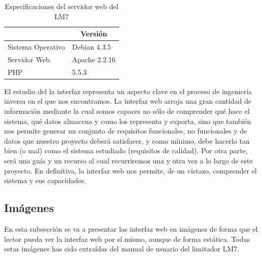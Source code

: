 \begin{table}[h]
    \centering
    \begin{tabular}{|l|l|}
        \hline
        \rowcolor[HTML]{ECF4FF}
        \multicolumn{1}{|c|}{\cellcolor[HTML]{ECF4FF}\textbf{Tecnología}} & \multicolumn{1}{c|}{\cellcolor[HTML]{ECF4FF}\textbf{Versión}} \\ \hline
        Sistema Operativo                                                 & Debian 4.3.5                                                  \\ \hline
        Servidor Web                                                      & Apache 2.2.16                                                 \\ \hline
        PHP                                                               & 5.5.3                                                         \\ \hline
    \end{tabular}
    \caption{Especificaciones del servidor web del \gls{LM7}}
    \label{tab:lm7_lamp_specs}
\end{table}

El estudio del la interfaz representa un aspecto clave en el proceso de ingeniería inversa en el que nos encontramos. La interfaz web arroja una gran cantidad de información mediante la cual somos capaces no sólo de comprender qué hace el sistema, qué datos almacena y como los representa y exporta, sino que también nos permite generar un conjunto de requisitos funcionales, no funcionales y de datos que nuestro proyecto deberá satisfacer, y como mínimo, debe hacerlo tan bien (o mal) como el sistema estudiado (requisitos de calidad). Por otra parte, será una guía y un recurso al cual recurriremos una y otra vez a lo largo de este proyecto. En definitiva, la interfaz web nos permite, de un vistazo, comprender el sistema y sus capacidades.

\subsection{Imágenes}

En esta subsección se va a presentar las interfaz web en imágenes de forma que el lector pueda ver la interfaz web por sí mismo, aunque de forma estática. Todas estas imágenes has sido extraídas del manual de usuario del limitador \acrshort{LM7}.

